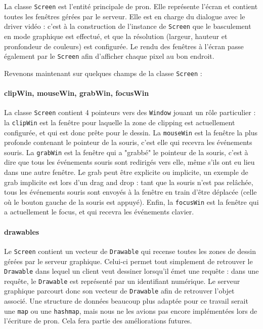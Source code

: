 La classe \verb|Screen| est l'entité principale de pron. Elle représente l'écran et contient toutes les fenêtres gérées par le serveur. Elle est en charge du dialogue avec le driver vidéo : c'est à la construction de l'instance de \verb|Screen| que le basculement en mode graphique est effectué, et que la résolution (largeur, hauteur et pronfondeur de couleurs) est configurée. Le rendu des fenêtres à l'écran passe également par le \verb|Screen| afin d'afficher chaque pixel au bon endroit.

Revenons maintenant sur quelques champs de la classe \verb|Screen| :
\paragraph{clipWin, mouseWin, grabWin, focusWin}
La classe \verb|Screen| contient 4 pointeurs vers des \verb|Window| jouant un rôle particulier : la \verb|clipWin| est la fenêtre pour laquelle la zone de clipping est actuellement configurée, et qui est donc prête pour le dessin. La \verb|mouseWin| est la fenêtre la plus profonde contenant le pointeur de la souris, c'est elle qui recevra les événements souris. La \verb|grabWin| est la fenêtre qui a "grabbé" le pointeur de la souris, c'est à dire que tous les événements souris sont redirigés vers elle, même s'ils ont eu lieu dans une autre fenêtre. Le grab peut être explicite ou implicite, un exemple de grab implicite est lors d'un drag and drop : tant que la souris n'est pas relâchée, tous les événements souris sont envoyés à la fenêtre en train d'être déplacée (celle où le bouton gauche de la souris est appuyé). Enfin, la \verb|focusWin| est la fenêtre qui a actuellement le focus, et qui recevra les événements clavier.

\paragraph{drawables}
Le \verb|Screen| contient un vecteur de \verb|Drawable| qui recense toutes les zones de dessin gérées par le serveur graphique. Celui-ci permet tout simplement de retrouver le \verb|Drawable| dans lequel un client veut dessiner lorsqu'il émet une requête : dans une requête, le \verb|Drawable| est représenté par un identifiant numérique. Le serveur graphique parcourt donc son vecteur de \verb|Drawable| afin de retrouver l'objet associé. Une structure de données beaucoup plus adaptée pour ce travail serait une \verb|map| ou une \verb|hashmap|, mais nous ne les avions pas encore implémentées lors de l'écriture de pron. Cela fera partie des améliorations futures.

